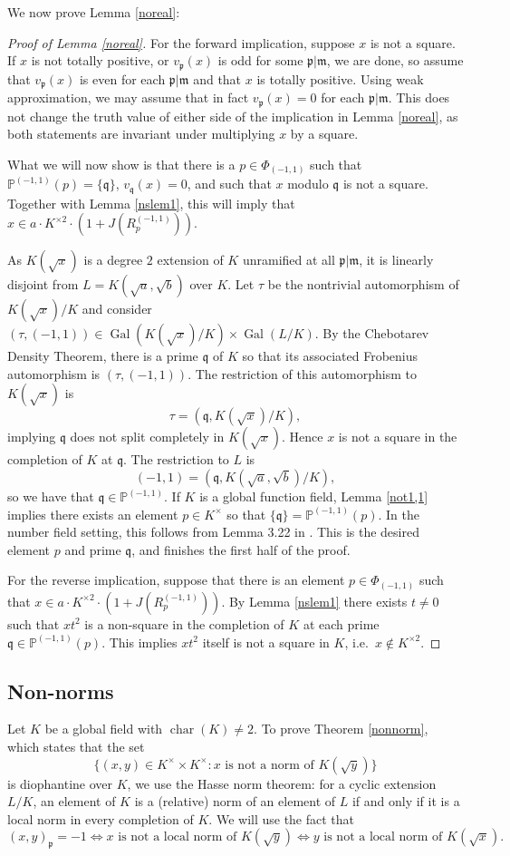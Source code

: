 \documentclass[12pt,reqno]{amsart}
\newcommand{\qq}{\mathfrak{q}}
\newcommand{\mm}{\mathfrak{m}}
\newcommand{\pp}{\mathfrak{p}}
\newcommand{\PP}{\mathbb{P}}
\DeclareMathOperator{\Gal}{Gal}
\DeclareMathOperator{\ch}{char}
\theoremstyle{definition}
\begin{document}
We now prove Lemma \ref{noreal}:
\begin{proof}[Proof of Lemma \ref{noreal}]
  For the forward implication, suppose $x$ is not a square. If $x$ is not totally positive, or $v_{\pp}(x)$ is odd for some $\pp|\mm$, we are done, so assume that $v_{\pp}(x)$ is even for each
  $\pp|\mm$ and that $x$ is totally positive. Using weak approximation, we may assume that in fact $v_\pp(x)=0$ for each
  $\pp|\mm$. This does not change the truth value of either
  side of the implication in Lemma \ref{noreal}, as both statements are invariant under
  multiplying $x$ by a square.

What we will now show is that there is a $p\in \Phi_{(-1,1)}$ such
that $\PP^{(-1,1)}(p)=\{\qq\}$, $v_{\qq}(x)=0$, and such that $x$ modulo $\qq$
is not a square. Together with Lemma \ref{nslem1}, this will imply that $x\in a\cdot
K^{\times2}\cdot(1+J(R_p^{(-1,1)}))$.

As $K(\sqrt{x})$ is a degree $2$ extension of $K$ unramified
at all $\pp|\mm$, it is linearly disjoint from
$L=K(\sqrt{a},\sqrt{b})$ over $K$. Let $\tau$ be the nontrivial
automorphism of $K(\sqrt{x})/K$ and consider $(\tau,(-1,1))\in
\Gal(K(\sqrt{x})/K)\times\Gal(L/K)$. By the
Chebotarev Density Theorem, there is a prime $\qq$ of $K$ so that its
associated Frobenius automorphism is $(\tau,(-1,1))$. The
restriction of this automorphism to $K(\sqrt{x})$ is
\[
\tau=(\qq,K(\sqrt{x})/K),
\]
implying $\qq$ does not split completely in $K(\sqrt{x})$. Hence $x$ is not a square
in the completion of $K$ at $\qq$. The restriction to $L$ is
\[
(-1,1)=(\qq,K(\sqrt{a},\sqrt{b})/K),
\]
so we have that $\qq\in \PP^{(-1,1)}$. If $K$ is a global function field, Lemma \ref{not1,1} implies there exists an element $p\in
K^{\times}$ so that $\{\qq\}= \PP^{(-1,1)}(p)$. In the number field setting, this follows from Lemma 3.22 in
\cite{Park}. This is the desired element $p$ and prime $\qq$, and finishes the first half of the proof.

For the reverse implication, suppose that there is an element $p\in \Phi_{(-1,1)}$ such that $x\in a\cdot K^{\times2}\cdot (1+J(R^{(-1,1)}_p))$. By Lemma \ref{nslem1} there exists $t\not=0$ such that $xt^2$ is a non-square in the completion of $K$ at each prime $\qq\in \PP^{(-1,1)}(p)$. This implies $xt^2$ itself is not a square in $K$, i.e.\ $x\not\in K^{\times2}$. 

\end{proof}

\subsection{Non-norms}\label{section:non-norms}
Let $K$ be a global field with $\ch(K)\not=2$. To prove Theorem \ref{nonnorm}, which states that the set
\[
\{(x,y)\in K^{\times}\times K^{\times}: x \text{ is not a norm of } K(\sqrt{y})\}
\]
is diophantine over $K$, we use the Hasse
norm theorem: for a cyclic extension $L/K$, an element of $K$ is a
(relative) norm of an element of $L$ if and only if it is a local norm in
every completion of $K$. We will use the fact that
\[
(x,y)_{\pp}=-1 \Leftrightarrow x \text{ is not a local norm of } K(\sqrt{y}) \Leftrightarrow y \text{ is not a local norm of } K(\sqrt{x}).
\]
\end{document}
